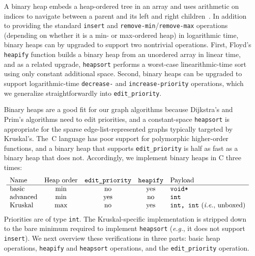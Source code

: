 \lstset{style=myTinyStyle}

A binary heap embeds a heap-ordered tree in an array and uses arithmetic on indices to navigate between a parent and its left and right children~\cite{clrs}.  In addition to providing the standard \texttt{insert} and \texttt{remove-min}/\texttt{remove-max} operations (depending on whether it is a min- or max-ordered heap) in logarithmic time, binary heaps can by upgraded to support two nontrivial operations.  First, Floyd's \texttt{heapify} function builds a binary heap from an unordered array in linear time, and as a related upgrade, \texttt{heapsort} performs a worst-case linearithmic-time sort using only constant additional space.  Second, binary heaps can be upgraded to support logarithmic-time \texttt{decrease-} and \texttt{increase-priority} operations, which we generalize straightforwardly into \texttt{edit\_priority}.

Binary heaps are a good fit for our graph algorithms because Dijkstra's and Prim's algorithms need to edit priorities, and a constant-space \texttt{heapsort} is appropriate for the sparse edge-list-represented graphs typically targeted by Kruskal's.  The~C language has poor support for polymorphic higher-order functions, and a binary heap that supports \texttt{edit\_priority} is half as fast as a binary heap that does not.  Accordingly, we implement binary heaps in C three times:
\[
\begin{array}{l@{\quad}c@{\quad}c@{\quad}c@{\quad}l}
\text{Name} & \text{Heap order} & \texttt{edit\_priority} & \texttt{heapify} & \text{Payload} \\
\hline
\text{basic} & \text{min} & \text{no} & \text{yes} & \texttt{void*} \\
\text{advanced} & \text{min} & \text{yes} & \text{no} & \texttt{int} \\
\text{Kruskal} & \text{max} & \text{no} & \text{yes} & \texttt{int, int} \text{ (\emph{i.e.}, unboxed)}
\end{array}
\]
Priorities are of type \texttt{int}.  %
The Kruskal-specific implementation is stripped down to the bare minimum required to implement \texttt{heapsort} (\emph{e.g.}, it does not support \texttt{insert}).  We next overview these verifications in three parts: basic heap operations, \texttt{heapify} and \texttt{heapsort} operations, and the \texttt{edit\_priority} operation.

